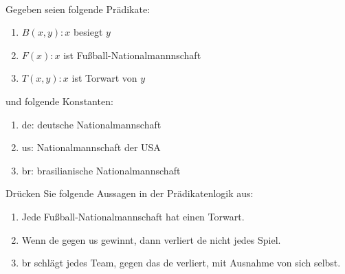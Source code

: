  \\
Gegeben seien folgende Prädikate: 
\begin{enumerate}
  \item $B(x,y): x$ besiegt $y$ 
  \item $F(x): x$ ist Fußball-Nationalmannnschaft
  \item $T(x,y): x$ ist Torwart von $y$
\end{enumerate}
und folgende Konstanten: 
\begin{enumerate}
  \item de: deutsche Nationalmannschaft
  \item us: Nationalmannschaft der USA
  \item br: brasilianische Nationalmannschaft
\end{enumerate} 
Drücken Sie folgende Aussagen in der Prädikatenlogik aus: 
\begin{enumerate}
  \item Jede Fußball-Nationalmannschaft hat einen Torwart.
  \item Wenn de gegen us gewinnt, dann verliert de nicht jedes Spiel.
  \item br schlägt jedes Team, gegen das de verliert, mit Ausnahme von sich selbst.
\end{enumerate} 

